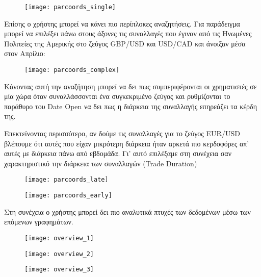 \begin{figure}[H]
  \centering
  \texttt{[image: parcoords\_single]}
  \label{fig:parcoords_single}
\end{figure}

Επίσης ο χρήστης μπορεί να κάνει πιο περίπλοκες αναζητήσεις. Για παράδειγμα μπορεί να επιλέξει πάνω στους άξονες τις συναλλαγές που έγιναν από τις Ηνωμένες Πολιτείες της Αμερικής στο ζεύγος GBP/USD και USD/CAD και άνοιξαν μέσα στον Απρίλιο:

\begin{figure}[H]
  \centering
  \texttt{[image: parcoords\_complex]}
  \label{fig:parcoords_complex}
\end{figure}

Κάνοντας αυτή την αναζήτηση μπορεί να δει πως συμπεριφέρονται οι χρηματιστές σε μία χώρα όταν συναλλάσσονται ένα συγκεκριμένο ζεύγος και ρυθμίζονται το παράθυρο του Date Open να δει πως η διάρκεια της συναλλαγής επηρεάζει τα κέρδη της.

Επεκτείνοντας περισσότερο, αν δούμε τις συναλλαγές για το ζεύγος EUR/USD βλέπουμε ότι αυτές που είχαν μικρότερη διάρκεια ήταν αρκετά πιο κερδοφόρες απ’ αυτές με διάρκεια πάνω από εβδομάδα. Γι’ αυτό επιλέξαμε στη συνέχεια σαν χαρακτηριστικό την διάρκεια των συναλλαγών (Trade Duration)

\begin{figure}[H]
  \centering
  \texttt{[image: parcoords\_late]}
  \label{fig:parcoords_late}
\end{figure}
\hfill
\begin{figure}[H]
  \centering
  \texttt{[image: parcoords\_early]}
  \label{fig:parcoords_early}
\end{figure}

Στη συνέχεια ο χρήστης μπορεί δει πιο αναλυτικά πτυχές των δεδομένων μέσω των επόμενων γραφημάτων.

\begin{figure}[H]
  \centering
  \texttt{[image: overview\_1]}
  \label{fig:overview_1}
\end{figure} 

\begin{figure}[H]
  \centering
  \texttt{[image: overview\_2]}
  \label{fig:overview_2}
\end{figure}

\begin{figure}[H]
  \centering
  \texttt{[image: overview\_3]}
  \label{fig:overview_3}
\end{figure}

